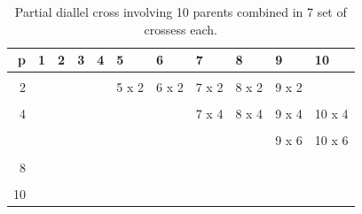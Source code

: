 \documentclass[11pt,dvipsnames,ignorenonframetext,aspectratio=169]{beamer}
\begin{document}
\begin{frame}{}
\protect\hypertarget{section-10}{}
\begingroup\fontsize{8}{10}\selectfont

\begin{longtable}[t]{rllllllllll}
\caption{\label{tab:partial-diallel-10p-table}Partial diallel cross involving 10 parents combined in 7 set of crossess each.}\\
\toprule
p & 1 & 2 & 3 & 4 & 5 & 6 & 7 & 8 & 9 & 10\\
\midrule
\cellcolor{gray!6}{1} & \cellcolor{gray!6}{} & \cellcolor{gray!6}{} & \cellcolor{gray!6}{} & \cellcolor{gray!6}{4 x 1} & \cellcolor{gray!6}{5 x 1} & \cellcolor{gray!6}{6 x 1} & \cellcolor{gray!6}{7 x 1} & \cellcolor{gray!6}{8 x 1} & \cellcolor{gray!6}{} & \cellcolor{gray!6}{}\\
2 &  &  &  &  & 5 x 2 & 6 x 2 & 7 x 2 & 8 x 2 & 9 x 2 & \\
\cellcolor{gray!6}{3} & \cellcolor{gray!6}{} & \cellcolor{gray!6}{} & \cellcolor{gray!6}{} & \cellcolor{gray!6}{} & \cellcolor{gray!6}{} & \cellcolor{gray!6}{6 x 3} & \cellcolor{gray!6}{7 x 3} & \cellcolor{gray!6}{8 x 3} & \cellcolor{gray!6}{9 x 3} & \cellcolor{gray!6}{10 x 3}\\
4 &  &  &  &  &  &  & 7 x 4 & 8 x 4 & 9 x 4 & 10 x 4\\
\cellcolor{gray!6}{5} & \cellcolor{gray!6}{} & \cellcolor{gray!6}{} & \cellcolor{gray!6}{} & \cellcolor{gray!6}{} & \cellcolor{gray!6}{} & \cellcolor{gray!6}{} & \cellcolor{gray!6}{} & \cellcolor{gray!6}{8 x 5} & \cellcolor{gray!6}{9 x 5} & \cellcolor{gray!6}{10 x 5}\\
\addlinespace
6 &  &  &  &  &  &  &  &  & 9 x 6 & 10 x 6\\
\cellcolor{gray!6}{7} & \cellcolor{gray!6}{} & \cellcolor{gray!6}{} & \cellcolor{gray!6}{} & \cellcolor{gray!6}{} & \cellcolor{gray!6}{} & \cellcolor{gray!6}{} & \cellcolor{gray!6}{} & \cellcolor{gray!6}{} & \cellcolor{gray!6}{} & \cellcolor{gray!6}{10 x 7}\\
8 &  &  &  &  &  &  &  &  &  & \\
\cellcolor{gray!6}{9} & \cellcolor{gray!6}{} & \cellcolor{gray!6}{} & \cellcolor{gray!6}{} & \cellcolor{gray!6}{} & \cellcolor{gray!6}{} & \cellcolor{gray!6}{} & \cellcolor{gray!6}{} & \cellcolor{gray!6}{} & \cellcolor{gray!6}{} & \cellcolor{gray!6}{}\\
10 &  &  &  &  &  &  &  &  &  & \\
\bottomrule
\end{longtable}
\endgroup{}
\end{frame}
\end{document}
